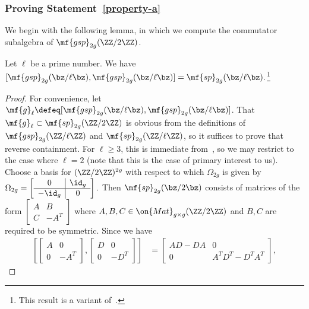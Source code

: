 \subsubsection{Proving Statement~\ref{property-a}}\label{honeyseek}

We begin with the following lemma, in which we compute the commutator subalgebra of $\mf{gsp}_{2g}(\ZZ / 2 \ZZ)$.

\begin{lemma} \label{lemma:gsp-perfect} 
	Let $\ell$ be a prime number. We have
	\(
		[\mf{gsp}_{2g}(\bz / \ell \bz), \mf{gsp}_{2g}(\bz / \ell \bz)] = \mf{sp}_{2g}(\bz / \ell \bz).
	\)\footnote{This result is a variant of~\cite[Proposition 2.10]{landesman-swaminathan-tao-xu:rational-families}.}
\end{lemma} 

\begin{proof} 
For convenience, let $\mf{g}_\ell \defeq [\mf{gsp}_{2g}(\bz / \ell \bz), \mf{gsp}_{2g}(\bz / \ell \bz)]$. That $\mf{g}_\ell \subset \mf{sp}_{2g}(\ZZ/2\ZZ)$ is obvious from the definitions of $\mf{gsp}_{2g}(\ZZ/\ell\ZZ)$ and $\mf{sp}_{2g}(\ZZ/\ell\ZZ)$, so it suffices to prove that reverse containment. For $\ell \geq 3$, this is immediate from~\cite[Proposition 2.10]{landesman-swaminathan-tao-xu:rational-families}, so we may restrict to the case where $\ell = 2$ (note that this is the case of primary interest to us). Choose a basis for $(\ZZ/2\ZZ)^{2g}$ with respect to which $\Omega_{2g}$ is given by
    \(
    	\Omega_{2g} = \left[ \begin{array}{c|c} 0 & \id_g \\  \hline  -\id_g & 0 \end{array} \right].
    \)
    Then $\mf{sp}_{2g}(\bz / 2 \bz)$ consists of matrices of the form
    \(
   	\left[ \begin{array}{c|c} A & B \\ \hline  C & -A^T \end{array} \right]
    \)
   where $A,B,C \in \on{Mat}_{g \times g}(\ZZ/2\ZZ)$ and $B,C$ are required to be symmetric. Since we have
\begin{align}
	\label{equation:block-diagonal-commutator}
 \left[ \left[\begin{array}{c|c} A & 0 \\ \hline 0 & -A^T \end{array}\right], \left[\begin{array}{c|c} D & 0 \\ \hline 0 & -D^T \end{array}\right] \right] & = \left[\begin{array}{c|c} AD - DA & 0 \\ \hline 0 & A^TD^T - D^TA^T \end{array}\right],

\end{align}
\end{proof}
